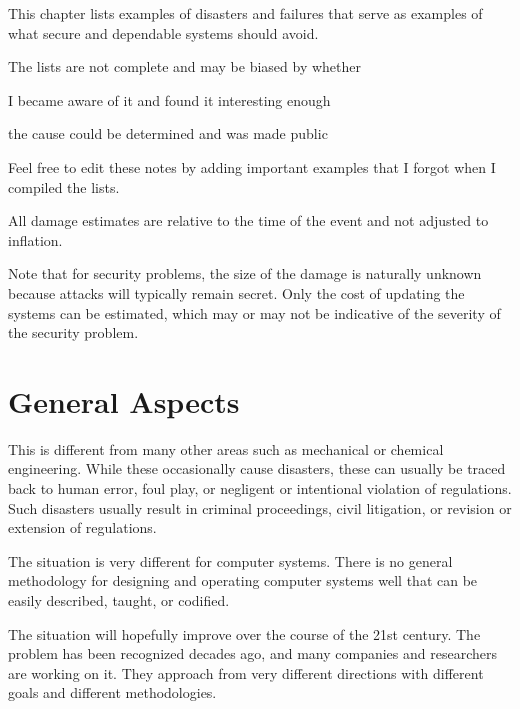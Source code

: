 This chapter lists examples of disasters and failures that serve as examples of what secure and dependable systems should avoid.

The lists are not complete and may be biased by whether
\begin{compactitem}
 \item I became aware of it and found it interesting enough
 \item the cause could be determined and was made public
\end{compactitem}
Feel free to edit these notes by adding important examples that I forgot when I compiled the lists.

All damage estimates are relative to the time of the event and not adjusted to inflation.

Note that for security problems, the size of the damage is naturally unknown because attacks will typically remain secret.
Only the cost of updating the systems can be estimated, which may or may not be indicative of the severity of the security problem.

\section{General Aspects}


This is different from many other areas such as mechanical or chemical engineering.
While these occasionally cause disasters, these can usually be traced back to human error, foul play, or negligent or intentional violation of regulations.
Such disasters usually result in criminal proceedings, civil litigation, or revision or extension of regulations.

The situation is very different for computer systems.
There is no general methodology for designing and operating computer systems well that can be easily described, taught, or codified.

The situation will hopefully improve over the course of the 21st century.
The problem has been recognized decades ago, and many companies and researchers are working on it.
They approach from very different directions with different goals and different methodologies.


